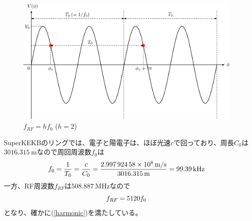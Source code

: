 \documentclass[10pt,a4paper]{ltjsarticle}
\begin{document}
\begin{figure}[hbt]
    \begin{center}
      \includegraphics[width=15cm,clip]{synchronous.pdf}
      \caption{$f_{RF} = h f_0$ ($h=2$)}
      \label{synchronous}
    \end{center}
\end{figure}

\vspace{\baselineskip}

\begin{tcolorbox}[title=\textgt{SuperKEKBにおける$f_{RF}$, $f_{0}$, $h$}の関係]
    SuperKEKBのリングでは、電子と陽電子は、ほぼ光速$c$で回っており、周長$C_0$は$\SI{3016.315}{\meter}$なので周回周波数$f_0$は
    \begin{equation}
      f_0 = \frac{1}{T_0}=\frac{c}{C_0}=\frac{\SI{2.99792458e8}{\meter / \second}}{\SI{3016.315}{\meter}}=\SI{99.39}{\kilo\hertz} \notag
    \end{equation}
    一方、RF周波数$f_{RF}$は$\SI{508.887}{\mega\hertz}$なので
    \begin{equation}
        f_{RF} = 5120 f_0 \notag
    \end{equation}
    となり、確かに(\ref{harmonic})を満たしている。
\end{tcolorbox}
\end{document}
